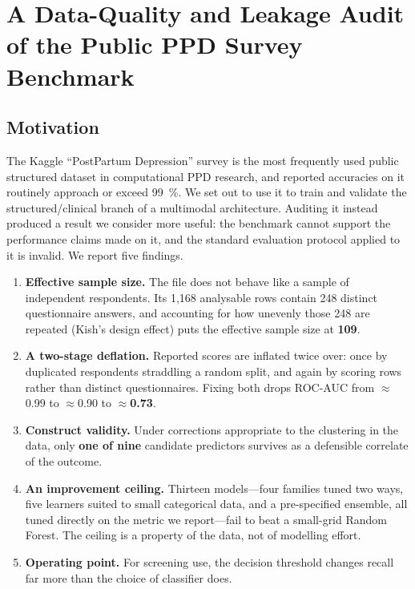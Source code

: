 %
%

\section{A Data-Quality and Leakage Audit of the Public PPD Survey Benchmark}
\label{sec:audit}

\subsection{Motivation}
\label{sec:audit:motivation}

The Kaggle ``PostPartum Depression'' survey is the most frequently used public structured
dataset in computational PPD research, and reported accuracies on it routinely approach or
exceed \SI{99}{\percent}. We set out to use it to train and validate the structured/clinical
branch of a multimodal architecture. Auditing it instead produced a result we consider more
useful: the benchmark cannot support the performance claims made on it, and the standard
evaluation protocol applied to it is invalid. We report five findings.

\begin{enumerate}
  \item \textbf{Effective sample size.} The file does not behave like a sample of independent
        respondents. Its 1{,}168 analysable rows contain 248 distinct questionnaire answers,
        and accounting for how unevenly those 248 are repeated (Kish's design effect) puts the
        effective sample size at \textbf{109}.
  \item \textbf{A two-stage deflation.} Reported scores are inflated twice over: once by
        duplicated respondents straddling a random split, and again by scoring rows rather than
        distinct questionnaires. Fixing both drops ROC-AUC from $\approx$0.99 to $\approx$0.90
        to \textbf{$\approx$0.73}.
  \item \textbf{Construct validity.} Under corrections appropriate to the clustering in the
        data, only \textbf{one of nine} candidate predictors survives as a defensible
        correlate of the outcome.
  \item \textbf{An improvement ceiling.} Thirteen models---four families tuned two ways, five
        learners suited to small categorical data, and a pre-specified ensemble, all tuned
        directly on the metric we report---fail to beat a small-grid Random Forest. The
        ceiling is a property of the data, not of modelling effort.
  \item \textbf{Operating point.} For screening use, the decision threshold changes recall far
        more than the choice of classifier does.
\end{enumerate}

